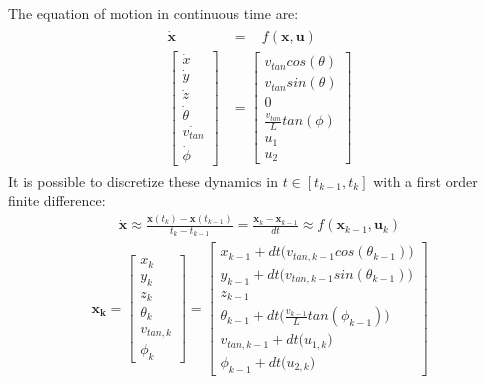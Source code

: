 The equation of motion in continuous time are:
\begin{align}
\begin{split}
\boldsymbol{\dot{x}} \ \ &= \ \ \ \  f(\boldsymbol{x},\boldsymbol{u}) \\[10pt]
\begin{bmatrix}
\dot{x}  \\[10pt]
\dot{y}  \\[10pt]
\dot{z} \\[10pt]
\dot{\theta} \\[10pt]
\dot{v_{tan}}  \\[10pt]
\dot{\phi}
\end{bmatrix}
&= 
\begin{bmatrix}
v_{tan} cos(\theta) \\[10pt]
v_{tan} sin(\theta) \\[10pt]
 0 \\[10pt]
\frac{v_{tan}}{L}tan(\phi)\\[10pt]
u_1 \\[10pt]
 u_2 
\end{bmatrix}
\label{eq:equation_nonholonomic_continuos}
\end{split}
\end{align}
It is possible to discretize these dynamics in $t \in [t_{k-1}, t_k]$ with a first order finite difference:
\begin{align}
\boldsymbol{\dot{x}} \approx \frac{\boldsymbol{x}(t_k)- \boldsymbol{x}(t_{k-1}) }{ t_k - t_{k-1}} = \frac{\boldsymbol{x}_k - \boldsymbol{x}_{k-1} }{dt} \approx f(\boldsymbol{x}_{k-1},\boldsymbol{u}_k) \nonumber
\end{align}
\begin{align}
\boldsymbol{x_k} = 
\begin{bmatrix}
x_k  \\[10pt]
y_k  \\[10pt]
z_k \\[10pt]
\theta_k \\[10pt]
v_{tan,k}  \\[10pt]
\phi_k
\end{bmatrix}
= 
\begin{bmatrix}
 x_{k-1} + dt \big(v_{tan,k-1} cos(\theta_{k-1})\big) \\[10pt]
 y_{k-1} + dt \big(v_{tan,k-1} sin(\theta_{k-1})\big) \\[10pt]
 z_{k-1} \\[10pt]
 \theta_{k-1} + dt\Big(\frac{v_{k-1}}{L}tan(\phi_{k-1}) \Big)\\[10pt]
v_{tan,k-1} + dt \big(u_{1,k}\big) \\[10pt]
\phi_{k-1} + dt \big(u_{2,k}\big) 
\end{bmatrix}
\label{eq:equation_nonholonomic_discrete}
\end{align}

